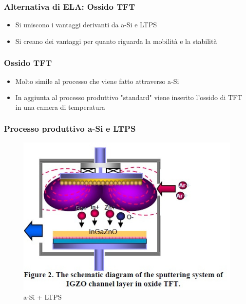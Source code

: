 \documentclass[12pt]{beamer}
\begin{document}
	\begin{frame}
		\frametitle{Alternativa di ELA: Ossido TFT}
		\begin{itemize}
			\item Si uniscono i vantaggi derivanti da a-Si e LTPS
			\pause
			\item Si creano dei vantaggi per quanto riguarda la mobilità e la stabilità
		\end{itemize}
	\end{frame}
	\begin{frame}
		\frametitle{Ossido TFT}
		\begin{itemize}
			\item Molto simile al processo che viene fatto attraverso a-Si
			\pause
			\item In aggiunta al processo produttivo "standard" viene inserito l'ossido di TFT in una camera di temperatura
		\end{itemize}
	\end{frame}
	\begin{frame}
		\frametitle{Processo produttivo a-Si e LTPS}
		\begin{figure}
			\centering
			\includegraphics[width=1\linewidth]{"FISICA/produzione LTPS + a-Si"}
			\caption{a-Si + LTPS}
			\label{fig:produzione-ltps--a-si}
		\end{figure}
	\end{frame}
\end{document}
